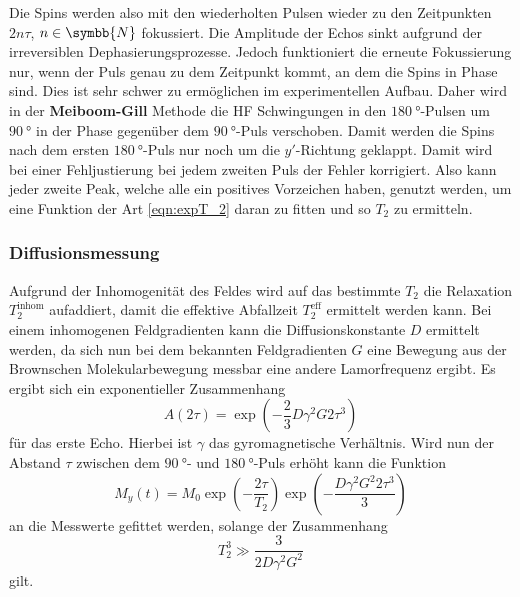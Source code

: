         \noindent Die Spins werden also mit den wiederholten Pulsen wieder zu den Zeitpunkten $2 n \tau$, $n\in \symbb{N}$ fokussiert. Die Amplitude der Echos sinkt aufgrund der irreversiblen Dephasierungsprozesse. 
        Jedoch funktioniert die erneute Fokussierung nur, wenn der Puls genau zu dem Zeitpunkt kommt, an dem die Spins in Phase sind. Dies ist sehr schwer zu ermöglichen im experimentellen Aufbau. 
        Daher wird in der \textbf{Meiboom-Gill} Methode die HF Schwingungen in den $\SI{180}{\degree}$-Pulsen um $\SI{90}{\degree}$ in der Phase gegenüber dem $\SI{90}{\degree}$-Puls verschoben. 
        Damit werden die Spins nach dem ersten $\SI{180}{\degree}$-Puls nur noch um die $y'$-Richtung geklappt. Damit wird bei einer Fehljustierung bei jedem zweiten Puls der Fehler korrigiert. Also kann 
        jeder zweite Peak, welche alle ein positives Vorzeichen haben, genutzt werden, um eine Funktion der Art \eqref{eqn:expT_2} daran zu fitten und so $T_2$ zu ermitteln.
        
    \subsubsection{Diffusionsmessung}

        \noindent Aufgrund der Inhomogenität des Feldes wird auf das bestimmte $T_2$ die Relaxation $T_2^{\text{inhom}}$ aufaddiert, damit die effektive Abfallzeit $T_2^{\text{eff}}$ ermittelt werden kann. 
        Bei einem inhomogenen Feldgradienten kann die Diffusionskonstante $D$ ermittelt werden, da sich nun bei dem bekannten Feldgradienten $G$ eine Bewegung aus der Brownschen Molekularbewegung messbar eine andere Lamorfrequenz ergibt. 
        Es ergibt sich ein exponentieller Zusammenhang 
        \begin{equation*}
            A ( 2 \tau ) = \exp(-\frac{2}{3} D \gamma^2 G2 \tau^3)
        \end{equation*}
        für das erste Echo. Hierbei ist $\gamma$ das gyromagnetische Verhältnis. 
        Wird nun der Abstand $\tau$ zwischen dem $\SI{90}{\degree}$- und $\SI{180}{\degree}$-Puls erhöht kann die Funktion 
        \begin{equation*}
            M_y (t) = M_0 \exp\left(- \frac{2 \tau}{T_2}\right)\exp\left(- \frac{D \gamma^2 G^2 2 \tau^3}{3}\right)
        \end{equation*}
        an die Messwerte gefittet werden, solange der Zusammenhang 
        \begin{equation*}
            T_2^3 \gg \frac{3}{2 D \gamma^2 G^2}
        \end{equation*}
        gilt. 


